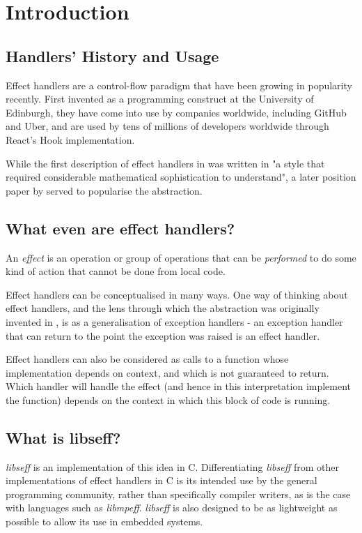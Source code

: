 \documentclass[logo,bsc,singlespacing,parskip,online]{infthesis}
\begin{document}
\chapter{Introduction}

\section{Handlers' History and Usage}
Effect handlers are a control-flow paradigm that have been growing in popularity recently. \citep{effekt-paper} First invented as a programming construct at the University of Edinburgh, they have come into use by companies worldwide, including GitHub and Uber, and are used by tens of millions of developers worldwide through React's Hook implementation. \citep{impact_study}

While the first description of effect handlers in \citet{og-paper} was written in "a style that required
considerable mathematical sophistication to understand", \citep{impact_study} a later position paper by \citeauthor{action-position-paper} served to popularise the abstraction.

\section{What even are effect handlers?}
An \textit{effect} is an operation or group of operations that can be \textit{performed} to do some kind of action that cannot be done from local code. 

Effect handlers can be conceptualised in many ways. One way of thinking about effect handlers, and the lens through which the abstraction was originally invented in \cite{og-paper}, is as a generalisation of exception handlers - an exception handler that can return to the point the exception was raised is an effect handler. \citep{ocaml-paper}

Effect handlers can also be considered as calls to a function whose implementation depends on context, and which is not guaranteed to return. Which handler will handle the effect (and hence in this interpretation implement the function) depends on the context in which this block of code is running. \citep{award-paper}

\section{What is libseff?}

\textit{libseff} is an implementation of this idea in C. Differentiating \textit{libseff} from other implementations of effect handlers in C is its intended use by the general programming community, rather than specifically compiler writers, as is the case with languages such as \textit{libmpeff}. \citep{libseff_paper} \citep{libmprompt} \textit{libseff} is also designed to be as lightweight as possible to allow its use in embedded systems. \citep{libseff_paper}
\end{document}
